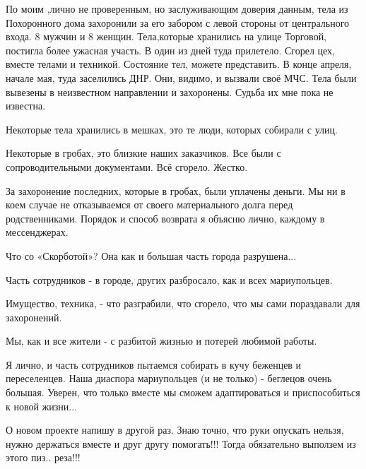 По моим ,лично не проверенным, но заслуживающим доверия данным, тела из
Похоронного дома захоронили за его забором с левой стороны от  центрального
входа. 8 мужчин и 8 женщин. Тела,которые хранились на улице Торговой,
постигла более ужасная участь. В один из дней туда прилетело. Сгорел
цех, вместе телами и техникой. Состояние тел, можете представить. В конце
апреля, начале мая, туда заселились ДНР. Они, видимо, и вызвали своё МЧС. Тела
были вывезены в неизвестном направлении и захоронены. Судьба их мне пока не
известна.

Некоторые тела хранились в мешках, это те люди, которых собирали с улиц.

Некоторые в гробах, это близкие наших заказчиков. Все были с сопроводительными
документами. Всё сгорело. Жестко.

За захоронение последних, которые в гробах, были уплачены деньги. Мы ни в коем
случае не отказываемся от своего материального долга перед родственниками.
Порядок и способ возврата я объясню лично, каждому в мессенджерах.

Что со «Скорботой»? Она как и большая часть города разрушена...    

Часть сотрудников - в городе, других разбросало, как и всех мариупольцев.

Имущество, техника, - что разграбили, что сгорело, что мы сами пораздавали для захоронений. 

Мы, как и все жители - с разбитой жизнью и потерей любимой работы.

Я лично, и часть сотрудников пытаемся собирать в кучу беженцев и
переселенцев. Наша диаспора мариупольцев (и не только) - беглецов очень
большая. Уверен, что только вместе мы сможем адаптироваться и приспособиться
к новой жизни...

О новом проекте напишу в другой раз.    Знаю точно, что руки опускать
нельзя, нужно держаться вместе и друг другу помогать!!!  Тогда обязательно
выползем из этого пиз.. реза!!!

